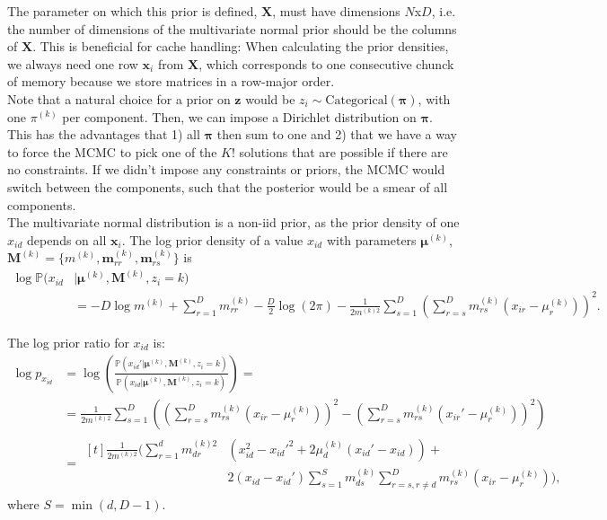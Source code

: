 \documentclass[a4paper,11pt]{article}
\def\M{\boldsymbol{M}}
\def\X{\boldsymbol{X}}
\def\x{\boldsymbol{x}}
\def\z{\boldsymbol{z}}
\def\bmrr{\boldsymbol m_{rr}}
\def\bmrs{\boldsymbol m_{rs}}
\def\bmu{\boldsymbol{\mu}}
\def\bpi{\boldsymbol{\pi}}
\def\p{\mathbb{P}}
\def\mrr{m_{rr}}
\begin{document}
The parameter on which this prior is defined, $\X$, must have dimensions $N$x$D$, i.e. the number of dimensions of the multivariate normal prior should be the columns of $\X$. This is beneficial for cache handling: When calculating the prior densities, we always need one row $\x_i$ from $\X$, which corresponds to one consecutive chunck of memory because we store matrices in a row-major order.\\
Note that a natural choice for a prior on $\z$ would be $z_i \sim \text{Categorical}(\bpi)$, with one $\pi^{(k)}$ per component. Then, we can impose a Dirichlet distribution on $\bpi$. This has the advantages that 1) all $\bpi$ then sum
to one and 2) that we have a way to force the MCMC to pick one of the $K!$ solutions that are possible if there are no constraints. If we didn’t impose any constraints or priors, the MCMC would switch between the components, such that the posterior would be a smear of all components. \\
The multivariate normal distribution is a non-iid prior, as the prior density of one $x_{id}$ depends on all $\x_i$. The log prior density of a value $x_{id}$ with parameters $\bmu^{(k)}$, $\M^{(k)} = \{m^{(k)}, \bmrr^{(k)}, \bmrs^{(k)}\}$ is
\begin{align}
\log \p(x_{id} &| \bmu^{(k)}, \M^{(k)}, z_i = k ) \nonumber \\
&= \label{eq:logPriorDensity_MultivariateNormalMixedModel}
 -D \log m^{(k)} + \sum_{r=1}^D \mrr^{(k)} -\frac{D}{2} \log (2\pi) -\frac{1}{2m^{(k)2}}\sum_{s = 1}^{D}\left(\sum_{r = s}^{D}m_{rs}^{(k)} (x_{ir} - \mu_r^{(k)}) \right)^2.
\end{align}

The log prior ratio for $x_{id}$ is:
\begin{align}
\log p_{x_{id}} &= \log \left( \frac{\p(x_{id}' | \bmu^{(k)}, \M^{(k)}, z_i = k)}{\p(x_{id} | \bmu^{(k)}, \M^{(k)}, z_i = k )} \right) = \nonumber \\
&=
 \frac{1}{2m^{(k)2}}\sum_{s = 1}^{D}\left( \left(\sum_{r = s}^{D}m^{(k)}_{rs} (x_{ir} - \mu_r^{(k)}) \right)^2- \left(\sum_{r = s}^{D}m_{rs}^{(k)} (x_{ir}' - \mu_r^{(k)}) \right)^2 \right) \nonumber \\
&=\begin{aligned}[t]
 \frac{1}{2m^{(k)2}}\Bigg(\sum_{r=1}^{d} m_{dr}^{(k)2} & \left(x_{id}^2 - x_{id}'^2 + 2\mu_d^{(k)}(x_{id}' - x_{id})\right) + \\
 & 2(x_{id} - x_{id}') \sum_{s=1}^{S} m_{ds}^{(k)} \sum_{r=s, r \neq d}^{D} m_{rs}^{(k)}(x_{ir} - \mu_r^{(k)}) \Bigg) \label{eq:logPriorRatio_MultivariateNormalMixedModel},
\end{aligned}
\end{align}
where $S = \min(d,D-1)$.
\end{document}
